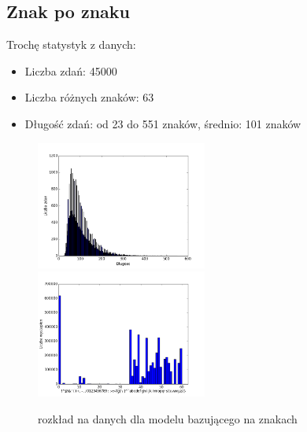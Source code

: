 \documentclass[11pt,leqno]{article}
\begin{document}
\subsection{Znak po znaku}
Trochę statystyk z danych:
\begin{itemize}
    \item Liczba zdań: 45000
    \item Liczba różnych znaków: 63
    \item Długość zdań: od 23 do 551 znaków, średnio: 101 znaków
\end{itemize}
\begin{figure}[!h]
    \includegraphics[width=0.5\textwidth]{pictures/char_length_distribution.png}
    \includegraphics[width=0.5\textwidth]{pictures/char_letters_distribution.png}
    \caption{rozkład na danych dla modelu bazującego na znakach}
\end{figure}
\end{document}
